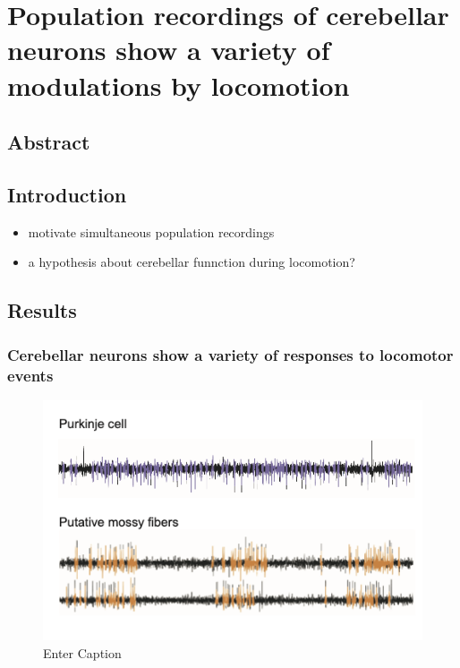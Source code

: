
%

\chapter{Population recordings of cerebellar neurons show a variety of modulations by locomotion}
\label{cha:locopixels}

\section{Abstract}
\section{Introduction}
\begin{itemize}
    \item motivate simultaneous population recordings
    \item a hypothesis about cerebellar funnction during locomotion?
\end{itemize}

\section{Results}
\subsection{Cerebellar neurons show a variety of responses to locomotor events}

\begin{figure}[h]
    \centering
    \includegraphics[width=.7\linewidth]{Chapters//Figures//chapter5/pkj_mossy_raw.png}
    \caption{Enter Caption}
    \label{fig:raw_channels}
\end{figure}

